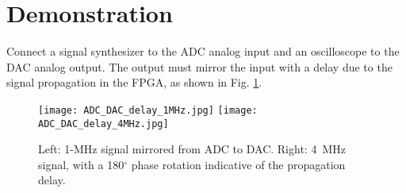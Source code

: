 \documentclass[10pt,oneside]{article}
\begin{document}
\section{Demonstration}

Connect a signal synthesizer to the ADC analog input and an oscilloscope to the DAC analog output.
The output must mirror the input with a delay due to the signal propagation in the FPGA, as shown
in Fig. \ref{1}.

\begin{figure}[h!tb]
\texttt{[image: ADC\_DAC\_delay\_1MHz.jpg]}
\texttt{[image: ADC\_DAC\_delay\_4MHz.jpg]}
\caption{Left: 1-MHz signal mirrored from ADC to DAC. Right: 4~MHz signal, with a 180$^\circ$
phase rotation indicative of the propagation delay.}
\label{1}
\end{figure}
\end{document}
